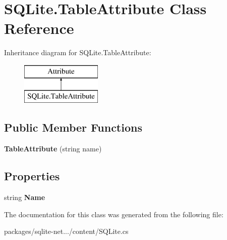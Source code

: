 \hypertarget{classSQLite_1_1TableAttribute}{}\section{S\+Q\+Lite.\+Table\+Attribute Class Reference}
\label{classSQLite_1_1TableAttribute}
Inheritance diagram for S\+Q\+Lite.\+Table\+Attribute\+:\begin{figure}[H]
\begin{center}
\leavevmode
\includegraphics[height=2.000000cm]{classSQLite_1_1TableAttribute}
\end{center}
\end{figure}
\subsection*{Public Member Functions}
\begin{DoxyCompactItemize}
\item 
\hypertarget{classSQLite_1_1TableAttribute_aa1d302b1fb306a6f5fcbbf5116c9ac55}{}{\bfseries Table\+Attribute} (string name)\label{classSQLite_1_1TableAttribute_aa1d302b1fb306a6f5fcbbf5116c9ac55}

\end{DoxyCompactItemize}
\subsection*{Properties}
\begin{DoxyCompactItemize}
\item 
\hypertarget{classSQLite_1_1TableAttribute_a74415d62264be7e853dbc29ce54c84cf}{}string {\bfseries Name}\label{classSQLite_1_1TableAttribute_a74415d62264be7e853dbc29ce54c84cf}

\end{DoxyCompactItemize}


The documentation for this class was generated from the following file\+:\begin{DoxyCompactItemize}
\item 
packages/sqlite-\/net.../content/S\+Q\+Lite.\+cs\end{DoxyCompactItemize}
